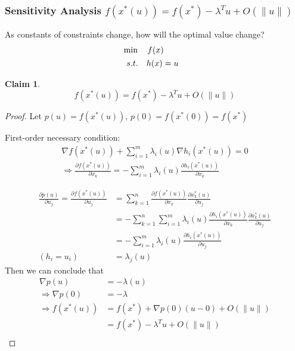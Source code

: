 \documentclass[11pt,a4paper]{article}
\newtheorem{claim}{Claim}
\begin{document}
\subsubsection{Sensitivity Analysis $f(x^*(u))=f(x^*)-\lambda^Tu+O(\|u\|)$}
As constants of constraints change, how will the optimal value change?
\begin{align*}
    &\min\quad f(x)\\
    &\begin{array}{r@{\quad}r@{}l@{\quad}l}
    s.t.
    &h(x)=u&\\
\end{array}
\end{align*}
\begin{claim}
    $$f(x^*(u))=f(x^*)-\lambda^Tu+O(\|u\|)$$
\end{claim}
\begin{proof}
    Let $p(u)=f(x^*(u))$, $p(0)=f(x^*(0))=f(x^*)$

    First-order necessary condition:
    \begin{equation}
        \begin{aligned}
            \nabla f(x^*(u))+\sum_{i=1}^m\lambda_i(u) \nabla h_i(x^*(u))=0\\
            \Rightarrow	\frac{\partial f(x^*(u))}{\partial x_k}=-\sum_{i=1}^m\lambda_i(u) \frac{\partial h_i(x^*(u))}{\partial x_k}
        \nonumber
        \end{aligned}
        \nonumber
    \end{equation}

    \begin{equation}
        \begin{aligned}
            \frac{\partial p(u)}{\partial u_j}=\frac{\partial f(x^*(u))}{\partial u_j}&=\sum_{k=1}^n\frac{\partial f(x^*(u))}{\partial x_k}\frac{\partial x_k^*(u)}{\partial u_j}\\
            &=-\sum_{k=1}^n\sum_{i=1}^m\lambda_i(u) \frac{\partial h_i(x^*(u))}{\partial x_k}\frac{\partial x_k^*(u)}{\partial u_j}\\
            &=-\sum_{i=1}^m\lambda_i(u) \frac{\partial h_i(x^*(u))}{\partial u_j}\\
            (h_i=u_i)\quad &=\lambda_j(u)
        \end{aligned}
        \nonumber
    \end{equation}
Then we can conclude that
\begin{equation}
    \begin{aligned}
        \nabla p(u)&=-\lambda(u)\\
        \Rightarrow	\nabla p(0)&=-\lambda\\
        \Rightarrow	f(x^*(u))&=f(x^*)+\nabla p(0)(u-0)+O(\|u\|)\\
        &=f(x^*)-\lambda^Tu+O(\|u\|)\\
    \end{aligned}
    \nonumber
\end{equation}
\end{proof}
\end{document}
